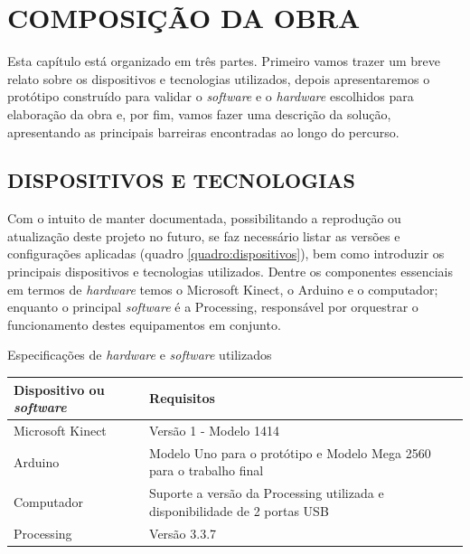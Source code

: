 \chapter{COMPOSIÇÃO DA OBRA}
Esta capítulo está organizado em três partes. Primeiro vamos trazer um breve relato sobre os dispositivos e tecnologias utilizados, depois apresentaremos o protótipo construído para validar o \textit{software} e o \textit{hardware} escolhidos para elaboração da obra e, por fim, vamos fazer uma descrição da solução, apresentando as principais barreiras encontradas ao longo do percurso. 

\section{DISPOSITIVOS E TECNOLOGIAS}

Com o intuito de manter documentada, possibilitando a reprodução ou atualização deste projeto no futuro, se faz necessário listar as versões e configurações aplicadas (quadro \ref{quadro:dispositivos}), bem como introduzir os principais dispositivos e tecnologias utilizados. Dentre os componentes essenciais em termos de \textit{hardware} temos o Microsoft Kinect, o Arduino e o computador; enquanto o principal \textit{software} é a Processing, responsável por orquestrar o funcionamento destes equipamentos em conjunto. 


\begin{quadro}[H]
\caption{\label{quadro:dispositivos}Especificações de \textit{hardware} e \textit{software} utilizados}
\begin{center}  
  \begin{tabulary}{0.8\textwidth}{|L|L|}
  
  \hline
  \textbf{Dispositivo ou \textit{software}} & \textbf{Requisitos} \\ \hline
  Microsoft Kinect  & Versão 1 - Modelo 1414 \\ \hline
  Arduino & Modelo Uno para o protótipo e Modelo Mega 2560 para o trabalho final \\ \hline
  Computador & Suporte a versão da Processing utilizada e disponibilidade de 2 portas USB \\ \hline
  Processing & Versão 3.3.7 \\ \hline
  \end{tabulary}
\end{center}
\vspace*{-0,7cm}
\\
\end{quadro}


